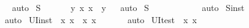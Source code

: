 \begin{isabellebody}
\isadelimproof
\ %
\endisadelimproof
%
\isatagproof
{}\isamarkupfalse%
\ auto%
\endisatagproof
{\isafoldproof}%
%
\isadelimproof
%
\endisadelimproof
\isanewline
{}\isamarkupfalse%
\ S{}\ {\isacharcolon}\ \ \ \ \ \ {\isachardoublequoteopen}\isactrlbold {\isasymforall}y{\isachardot}\ \isactrlbold {\isasymexists}x{\isachardot}\ x\ \isactrlbold {\isacharequal}\ y{\isachardoublequoteclose}%
\isadelimproof
\ %
\endisadelimproof
%
\isatagproof
{}\isamarkupfalse%
\ auto%
\endisatagproof
{\isafoldproof}%
%
\isadelimproof
%
\endisadelimproof
\isanewline
{}\isamarkupfalse%
\ S{}\ {\isacharcolon}\ \ \ \ \ \ {\isachardoublequoteopen}{\isasymalpha}\ \isactrlbold {\isacharequal}\ {\isasymalpha}{\isachardoublequoteclose}%
\isadelimproof
\ %
\endisadelimproof
%
\isatagproof
{}\isamarkupfalse%
\ auto%
\endisatagproof
{\isafoldproof}%
%
\isadelimproof
%
\endisadelimproof
\isanewline
{}\isamarkupfalse%
\ S{}{\isacharunderscore}inst\ {\isacharcolon}\ {\isachardoublequoteopen}{\isacharparenleft}{\isasymPhi}{\isacharparenleft}{\isasymalpha}{\isacharparenright}\ \isactrlbold {\isasymand}\ {\isacharparenleft}{\isasymalpha}\ \isactrlbold {\isacharequal}\ {\isasymbeta}{\isacharparenright}{\isacharparenright}\ \isactrlbold {\isasymrightarrow}\ {\isasymPhi}{\isacharparenleft}{\isasymbeta}{\isacharparenright}{\isachardoublequoteclose}%
\isadelimproof
\ %
\endisadelimproof
%
\isatagproof
{}\isamarkupfalse%
\ auto%
\endisatagproof
{\isafoldproof}%
%
\isadelimproof
%
\endisadelimproof
\isanewline
{}\isamarkupfalse%
\ UI{\isacharunderscore}inst\ {\isacharcolon}\ {\isachardoublequoteopen}{\isacharparenleft}{\isacharparenleft}\isactrlbold {\isasymforall}x{\isachardot}\ {\isasymPhi}{\isacharparenleft}x{\isacharparenright}{\isacharparenright}\ \isactrlbold {\isasymand}\ {\isacharparenleft}\isactrlbold {\isasymexists}x{\isachardot}\ x\ \isactrlbold {\isacharequal}\ {\isasymalpha}{\isacharparenright}{\isacharparenright}\ \isactrlbold {\isasymrightarrow}\ {\isasymPhi}{\isacharparenleft}{\isasymalpha}{\isacharparenright}{\isachardoublequoteclose}%
\isadelimproof
\ %
\endisadelimproof
%
\isatagproof
{}\isamarkupfalse%
\ auto%
\endisatagproof
{\isafoldproof}%
%
\isadelimproof
%
\endisadelimproof
\isanewline
{}\isamarkupfalse%
\ UI{\isacharunderscore}test\ {\isacharcolon}\ {\isachardoublequoteopen}{\isacharparenleft}\isactrlbold {\isasymforall}x{\isachardot}\ {\isasymPhi}{\isacharparenleft}x{\isacharparenright}{\isacharparenright}\ \isactrlbold {\isasymrightarrow}\ {\isasymPhi}{\isacharparenleft}{\isasymalpha}{\isacharparenright}{\isachardoublequoteclose}\ \isamarkupfalse%

\end{isabellebody}
